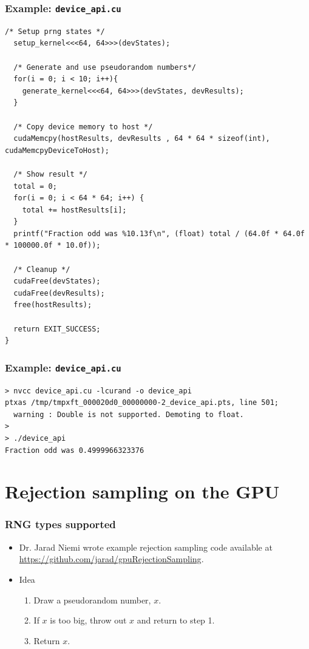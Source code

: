 \documentclass[handout]{beamer}
\numberwithin{equation}{section}
\begin{document}
\begin{frame}[fragile]
\frametitle{Example: {\tt device\_api.cu}} \lstset{basicstyle=\tiny}
\begin{lstlisting}[name=dev]
  /* Setup prng states */
  setup_kernel<<<64, 64>>>(devStates);

  /* Generate and use pseudorandom numbers*/ 
  for(i = 0; i < 10; i++){
    generate_kernel<<<64, 64>>>(devStates, devResults);
  }
  
  /* Copy device memory to host */ 
  cudaMemcpy(hostResults, devResults , 64 * 64 * sizeof(int), cudaMemcpyDeviceToHost);

  /* Show result */
  total = 0;
  for(i = 0; i < 64 * 64; i++) {
    total += hostResults[i];
  }
  printf("Fraction odd was %10.13f\n", (float) total / (64.0f * 64.0f * 100000.0f * 10.0f)); 

  /* Cleanup */
  cudaFree(devStates);
  cudaFree(devResults);
  free(hostResults);
  
  return EXIT_SUCCESS;
}
\end{lstlisting}
\end{frame}


\begin{frame}[fragile]
\frametitle{Example: {\tt device\_api.cu}} \lstset{basicstyle=\tiny}
\lstset{language=bash}
\begin{lstlisting}
> nvcc device_api.cu -lcurand -o device_api
ptxas /tmp/tmpxft_000020d0_00000000-2_device_api.pts, line 501;
  warning : Double is not supported. Demoting to float.
>
> ./device_api
Fraction odd was 0.4999966323376
\end{lstlisting}
\end{frame}



\section{Rejection sampling on the GPU}


\begin{frame}
\frametitle{RNG types supported}
\begin{itemize}
\item Dr. Jarad Niemi wrote example rejection sampling code available at \url{https://github.com/jarad/gpuRejectionSampling}.
\pause \item Idea
\begin{enumerate}
 \item Draw a pseudorandom number, $x$.
\pause \item If $x$ is too big, throw out $x$ and return to step 1.
\pause \item Return $x$.
\end{enumerate}
\end{itemize}
\end{frame}
\end{document}

